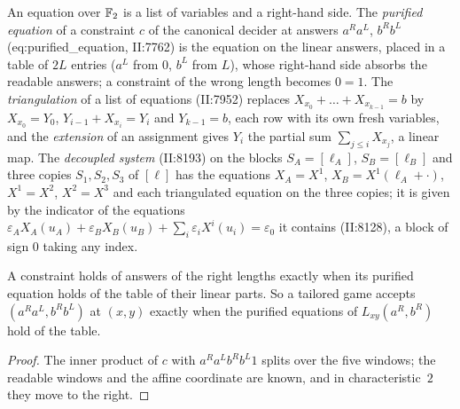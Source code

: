 \begin{definition}
\label{def:ar-linear}
\leanok
An equation over $\mathbb{F}_2$ is a list of variables and a right-hand side. The \emph{purified
equation} of a constraint $c$ of the canonical decider at answers $a^R a^L$, $b^R b^L$
(eq:purified\_equation, II:7762) is the equation on the linear answers, placed in a table of
$2L$ entries ($a^L$ from $0$, $b^L$ from $L$), whose right-hand side absorbs the readable
answers; a constraint of the wrong length becomes $0 = 1$. The \emph{triangulation} of a list
of equations (II:7952) replaces $X_{x_0} + \dots + X_{x_{k-1}} = b$ by $X_{x_0} = Y_0$,
$Y_{i-1} + X_{x_i} = Y_i$ and $Y_{k-1} = b$, each row with its own fresh variables, and the
\emph{extension} of an assignment gives $Y_i$ the partial sum $\sum_{j \le i} X_{x_j}$, a linear
map. The \emph{decoupled system} (II:8193) on the blocks $S_A = [\ell_A]$, $S_B = [\ell_B]$ and
three copies $S_1, S_2, S_3$ of $[\ell]$ has the equations $X_A = X^1$, $X_B = X^1(\ell_A + \cdot)$,
$X^1 = X^2$, $X^2 = X^3$ and each triangulated equation on the three copies; it is given by the
indicator of the equations $\varepsilon_A X_A(u_A) + \varepsilon_B X_B(u_B) + \sum_i
\varepsilon_i X^i(u_i) = \varepsilon_0$ it contains (II:8128), a block of sign $0$ taking any
index.
\end{definition}

\begin{lemma}
\label{lem:ar-purification}
\leanok
A constraint holds of answers of the right lengths exactly when its purified equation holds of
the table of their linear parts. So a tailored game accepts $(a^R a^L, b^R b^L)$ at $(x, y)$
exactly when the purified equations of $L_{xy}(a^R, b^R)$ hold of the table.
\end{lemma}

\begin{proof}
\leanok
The inner product of $c$ with $a^R a^L b^R b^L 1$ splits over the five windows; the readable
windows and the affine coordinate are known, and in characteristic~$2$ they move to the right.
\end{proof}

